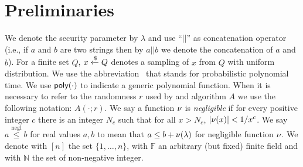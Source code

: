 \section{Preliminaries} \label{preliminaries}
We denote the security parameter by $\lambda$ and use ``$||$'' as concatenation operator 
(i.e., if $a$ and $b$ are two strings then by $a||b$ we denote the concatenation of $a$ and $b$). 
For a finite set $Q$, $x\xleftarrow{\text{\$}} Q$ denotes a sampling of $x$ from $Q$ 
with uniform distribution. 
We use the abbreviation \ppt\ that stands for probabilistic polynomial time. We use $\textsf{poly}(\cdot)$
 to indicate a generic polynomial function. 
When it is necessary to refer to the randomness $r$ used by and algorithm $A$ we use the following notation: $A(\cdot;r)$.
We say a function $\nu$ is {\em negligible} if for every positive integer $c$ there is an integer $N_c$ such that for all $x > N_c$, $|\nu(x)|< 1/x^c$.
We say $a \stackrel{\text{negl}}{\leq} b$ for real values $a, b$ to mean that $a \leq b + \nu(\lambda)$ for negligible function $\nu$.
We denote with $[n]$ the set  $\{1,\dots,n\}$, with $\mathbb{F}$ an arbitrary (but fixed) finite field and with $\mathbb{N}$ the set of non-negative integer.








